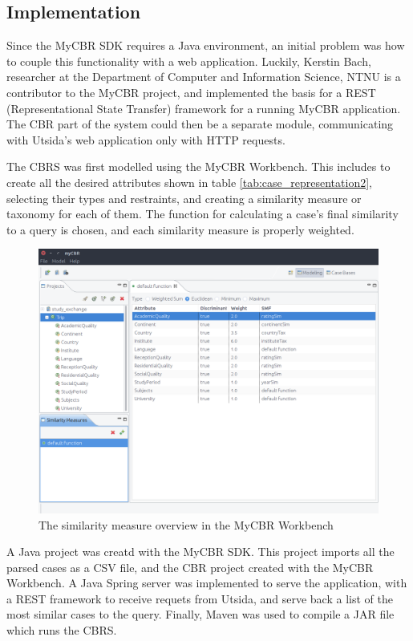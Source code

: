 \subsection{Implementation}

Since the MyCBR SDK requires a Java environment, an initial problem was how to couple this functionality with a web application. Luckily, Kerstin Bach, researcher at the Department of Computer and Information Science, NTNU is a contributor to the MyCBR project, and implemented the basis for a REST (Representational State Transfer) framework for a running MyCBR application. The CBR part of the system could then be a separate module, communicating with Utsida's web application only with HTTP requests.

The CBRS was first modelled using the MyCBR Workbench. This includes to create all the desired attributes shown in table \ref{tab:case_representation2}, selecting their types and restraints, and creating a similarity measure or taxonomy for each of them. The function for calculating a case's final similarity to a query is chosen, and each similarity measure is properly weighted.

\begin{figure}[H]
    \label{fig:workbench_exmaple}
    \centering
    \includegraphics[width=1\textwidth]{fig/cbr_model.png}
    \caption{The similarity measure overview in the MyCBR Workbench}
\end{figure}

A Java project was creatd with the MyCBR SDK. This project imports all the parsed cases as a CSV file, and the CBR project created with the MyCBR Workbench. A Java Spring server was implemented to serve the application, with a REST framework to receive requets from Utsida, and serve back a list of the most similar cases to the query. Finally, Maven was used to compile a JAR file which runs the CBRS. 


